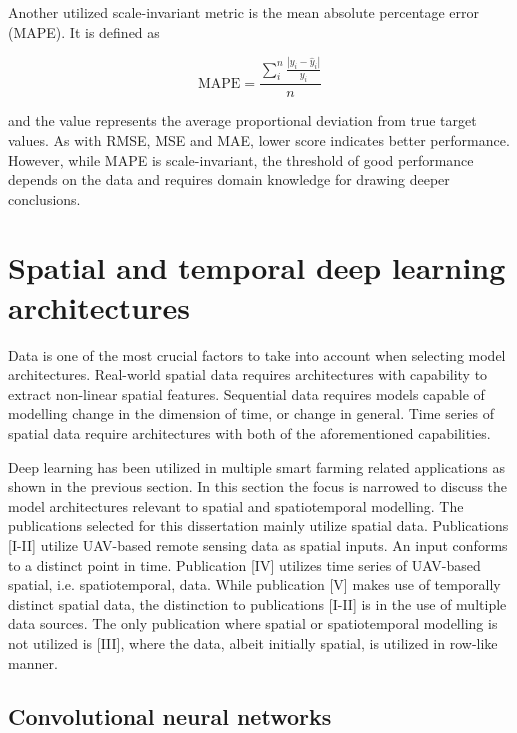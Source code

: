 Another utilized scale-invariant metric is the mean absolute percentage error (MAPE). It is defined as

\begin{equation}
    \text{MAPE}=\frac{ \sum^{n}_{i} \frac{|y_i-\hat{y}_i|}{y_i} }{n}
\end{equation}

\noindent and the value represents the average proportional deviation from true target values. As with RMSE, MSE and MAE, lower score indicates better performance. However, while MAPE is scale-invariant, the threshold of good performance depends on the data and requires domain knowledge for drawing deeper conclusions.


\section{Spatial and temporal deep learning architectures}
\label{sec:spatial-temporal-dl-review}

Data is one of the most crucial factors to take into account when selecting model architectures. Real-world spatial data requires architectures with capability to extract non-linear spatial features. Sequential data requires models capable of modelling change in the dimension of time, or change in general. Time series of spatial data require architectures with both of the aforementioned capabilities. 

Deep learning has been utilized in multiple smart farming related applications as shown in the previous section. In this section the focus is narrowed to discuss the model architectures relevant to spatial and spatiotemporal modelling. The publications selected for this dissertation mainly utilize spatial data. Publications [I-II] utilize UAV-based remote sensing data as spatial inputs. An input conforms to a distinct point in time. Publication [IV] utilizes time series of UAV-based spatial, i.e. spatiotemporal, data. While publication [V] makes use of temporally distinct spatial data, the distinction to publications [I-II] is in the use of multiple data sources. The only publication where spatial or spatiotemporal modelling is not utilized is [III], where the data, albeit initially spatial, is utilized in row-like manner.
 
\subsection{Convolutional neural networks}
\label{subsec:cnn-review}

